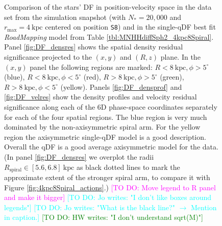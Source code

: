\documentclass[iop,revtex4,numberedappendix,appendixfloats]{emulateapj}
\newcommand{\RM}{{\sl RoadMapping}}
\newcommand{\Wilma}[1]{\textcolor{Magenta}{#1}}
\newcommand{\HW}[1]{\textcolor{Green}{#1}}
\newcommand{\Jo}[1]{\textcolor{Cyan}{#1}}
\begin{document}
\begin{figure}[!htbp]
  \caption{Comparison of the stars' DF in position-velocity space in the data set from the simulation snapshot (with $N_*=20,000$ and $r_\text{max}=4~\text{kpc}$ centered on position \texttt{S8}) and in the single-qDF best fit \RM{} model from Table \ref{tbl:MNHHdiffSph2_4kpc8Spiral}. Panel \ref{fig:DF_densres} shows the spatial density residual significance projected to the $(x,y)$ and $(R,z)$ plane. In the $(x,y)$ panel the following regions are marked: $R<8~\text{kpc},\phi>5^\circ$ (blue), $R<8~\text{kpc},\phi<5^\circ$ (red), $R>8~\text{kpc},\phi>5^\circ$ (green), $R>8~\text{kpc},\phi<5^\circ$ (yellow). Panels \ref{fig:DF_densprof} and \ref{fig:DF_velres} show the density profiles and velocity residual significance along each of the 6D phase-space coordinates separately for each of the four spatial regions. The blue region is very much dominated by the non-axisymmetric spiral arm. For the yellow region the axisymmetric single-qDF model is a good description. Overall the qDF is a good average axisymmetric model for the data. (In panel \ref{fig:DF_densres} we overplot the radii $R_\text{spiral} \in [5.6,6.8]~\text{kpc}$ as black dotted lines to mark the approximate extent of the stronger spiral arm, to compare it with Figure \ref{fig:4kpc8Spiral_actions}.) \Wilma{[TO DO: Move legend to R panel and make it bigger]} \Jo{[TO DO: Jo writes: "I don't like boxes around legends"]} \Jo{[TO DO: Jo writes: "What is the black line?" $\longrightarrow$ Mention in caption.]} \HW{[TO DO: HW writes: "I don't understand sqrt(M)"]}}
  \label{fig:4kpc8Spiral_DF_comparison}
\end{figure}
\end{document}
